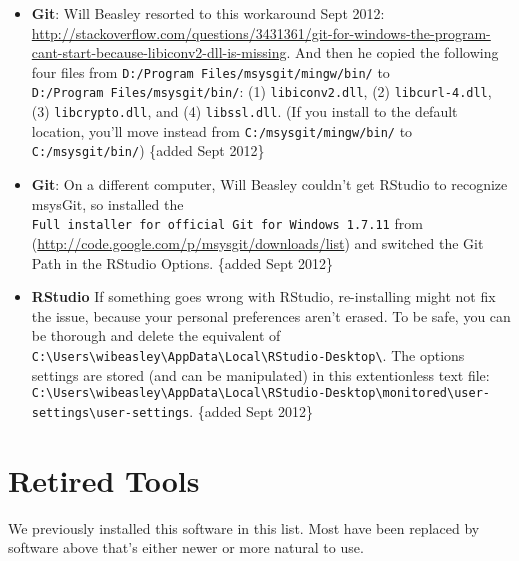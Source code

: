 \documentclass[
]{book}
\begin{document}
\begin{itemize}
\item
  \textbf{Git}: Will Beasley resorted to this workaround Sept 2012: \url{http://stackoverflow.com/questions/3431361/git-for-windows-the-program-cant-start-because-libiconv2-dll-is-missing}. And then he copied the following four files from \texttt{D:/Program\ Files/msysgit/mingw/bin/} to \texttt{D:/Program\ Files/msysgit/bin/}: (1) \texttt{libiconv2.dll}, (2) \texttt{libcurl-4.dll}, (3) \texttt{libcrypto.dll}, and (4) \texttt{libssl.dll}. (If you install to the default location, you'll move instead from \texttt{C:/msysgit/mingw/bin/} to \texttt{C:/msysgit/bin/}) \{added Sept 2012\}
\item
  \textbf{Git}: On a different computer, Will Beasley couldn't get RStudio to recognize msysGit, so installed the \texttt{Full\ installer\ for\ official\ Git\ for\ Windows\ 1.7.11} from (\url{http://code.google.com/p/msysgit/downloads/list}) and switched the Git Path in the RStudio Options. \{added Sept 2012\}
\item
  \textbf{RStudio} If something goes wrong with RStudio, re-installing might not fix the issue, because your personal preferences aren't erased. To be safe, you can be thorough and delete the equivalent of \texttt{C:\textbackslash{}Users\textbackslash{}wibeasley\textbackslash{}AppData\textbackslash{}Local\textbackslash{}RStudio-Desktop\textbackslash{}}. The options settings are stored (and can be manipulated) in this extentionless text file: \texttt{C:\textbackslash{}Users\textbackslash{}wibeasley\textbackslash{}AppData\textbackslash{}Local\textbackslash{}RStudio-Desktop\textbackslash{}monitored\textbackslash{}user-settings\textbackslash{}user-settings}. \{added Sept 2012\}
\end{itemize}

\hypertarget{retired-tools}{%
\section{Retired Tools}\label{retired-tools}}

We previously installed this software in this list. Most have been replaced by software above that's either newer or more natural to use.
\end{document}
